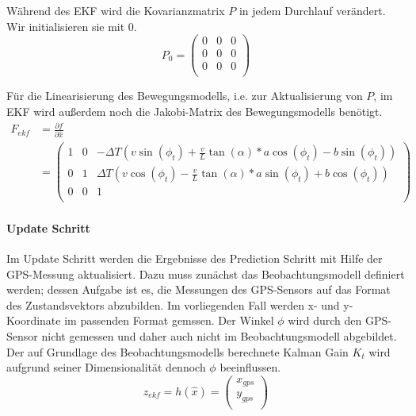 \documentclass[11pt]{scrartcl}
\begin{document}
{Während des EKF wird die Kovarianzmatrix $P$ in jedem Durchlauf verändert. Wir initialisieren sie mit $0$. 
\begin{equation}\label{EKF-Initiale-Kovarianzmatrix}
	P_{0} = \begin{pmatrix}
		0 & 0 & 0 \\
		0 & 0 & 0 \\
		0 & 0 & 0 \\
	  \end{pmatrix}
\end{equation}

Für die Linearisierung des Bewegungsmodells, i.e. zur Aktualisierung von $P$, im EKF wird außerdem noch die Jakobi-Matrix des Bewegungsmodells benötigt.
\begin{equation}\label{EKF-Motion-Model-Jakobi-Matrix}
\begin{split}
	F_{ekf} &= \frac{\partial f}{\partial \hat{x}} \\
	&= \begin{pmatrix}
		1 & 0 & -\Delta T(v\sin(\phi_t)+\frac{v}{L}\tan(\alpha)*a\cos(\phi_t)-b\sin(\phi_t)) \\
		0 & 1 & \Delta T(v\cos(\phi_t)-\frac{v}{L}\tan(\alpha)*a\sin(\phi_t)+b\cos(\phi_t)) \\
		0 & 0 & 1 \\
	  \end{pmatrix}
\end{split}
\end{equation}

\paragraph{Update Schritt}
Im Update Schritt werden die Ergebnisse des Prediction Schritt mit Hilfe der GPS-Messung aktualisiert. Dazu muss zunächst das Beobachtungsmodell definiert werden; dessen Aufgabe ist es, die Messungen des GPS-Sensors auf das Format des Zustandsvektors abzubilden. Im vorliegenden Fall werden x- und y-Koordinate im passenden Format gemssen. Der Winkel $\phi$ wird durch den GPS-Sensor nicht gemessen und daher auch nicht im Beobachtungsmodell abgebildet. Der auf Grundlage des Beobachtungsmodells berechnete Kalman Gain $K_t$ wird aufgrund seiner Dimensionalität dennoch $\phi$ beeinflussen.
\begin{equation}\label{EKF-Observation-Model}
	z_{ekf} = h(\hat{x}) = \begin{pmatrix}
		x_{gps} \\
		y_{gps} \\
	\end{pmatrix}
\end{equation}

}
\end{document}
